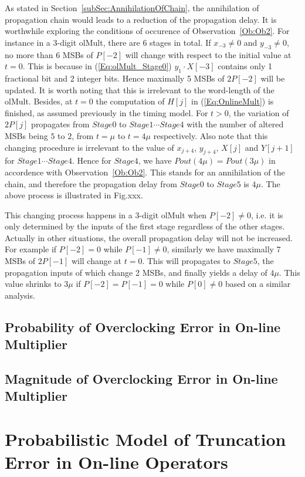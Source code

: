 \documentclass[a4paper, 11pt]{article}
\begin{document}

As stated in Section~\ref{subSec:AnnihilationOfChain}, the annihilation of propagation chain would leads to a reduction of the propagation delay. It is worthwhile exploring the conditions of occurence of Observation~\ref{Ob:Ob2}. For instance in a 3-digit olMult, there are 6 stages in total. If $x_{-3}\neq0$ and $y_{-3}\neq0$, no more than 6 MSBs of $P[-2]$ will change with respect to the initial value at $t=0$. This is because in (\ref{Eq:olMult_Stage0}) $y_1\cdot X[-3]$ contains only 1 fractional bit and 2 integer bits. Hence maximally 5 MSBs of $2P[-2]$ will be updated. It is worth noting that this is irrelevant to the word-length of the olMult. Besides, at $t=0$ the computation of $H[j]$ in (\ref{Eq:OnlineMult}) is finished, as assumed previously in the timing model. For $t>0$, the variation of $2P[j]$ propagates from $Stage0$ to $Stage1\cdots Stage4$ with the number of altered MSBs being $5$ to $2$, from $t=\mu$ to $t=4\mu$ respectively. Also note that this changing procedure is irrelevant to the value of $x_{j+4}$, $y_{j+4}$, $X[j]$ and $Y[j+1]$ for $Stage1\cdots Stage4$. Hence for $Stage4$, we have $Pout(4\mu)=Pout(3\mu)$ in accordence with Observation~\ref{Ob:Ob2}. This stands for an annihilation of the chain, and therefore the propagation delay from $Stage0$ to $Stage5$ is $4\mu$. The above process is illustrated in Fig.xxx. 

This changing process happens in a 3-digit olMult when $P[-2]\neq0$, i.e. it is only determined by the inputs of the first stage regardless of the other stages. Actually in other situations, the overall propagation delay will not be increased. For example if $P[-2]=0$ while $P[-1]\neq0$, similarly we have maximally 7 MSBs of $2P[-1]$ will change at $t=0$. This will propagates to $Stage5$, the propagation inputs of which change 2 MSBs, and finally yields a delay of $4\mu$. This value shrinks to $3\mu$ if $P[-2]=P[-1]=0$ while $P[0]\neq0$ based on a similar analysis.


\subsection{Probability of Overclocking Error in On-line Multiplier}

\subsection{Magnitude of Overclocking Error in On-line Multiplier}

\section{Probabilistic Model of Truncation Error in On-line Operators}
\end{document}
